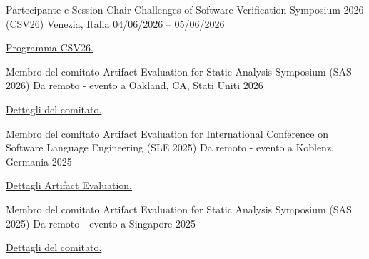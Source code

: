
\begin{cventries}

    \cventry
        {Partecipante e Session Chair} %
        {Challenges of Software Verification Symposium 2026 (CSV26)} %
        {Venezia, Italia} %
        {04/06/2026 – 05/06/2026} %
        {
        \begin{cvitems} %
            \item {\href{https://unive-ssv.github.io/csv.html}{Programma CSV26.}}
        \end{cvitems}
        }

    \cventry
        {Membro del comitato} %
        {Artifact Evaluation for Static Analysis Symposium (SAS 2026)} %
        {Da remoto - evento a Oakland, CA, Stati Uniti} %
        {2026} %
        {
        \begin{cvitems} %
            \item {\href{https://conf.researchr.org/committee/splash-issta-2026/sas-2026-sas-artifact-sas-artifact-evaluation-committee}{Dettagli del comitato.}}
        \end{cvitems}
        }

    \cventry
        {Membro del comitato} %
        {Artifact Evaluation for International Conference on Software Language Engineering (SLE 2025)} %
        {Da remoto - evento a Koblenz, Germania} %
        {2025} %
        {
        \begin{cvitems} %
            \item {\href{https://www.sleconf.org/2025/ArtifactEvaluation.html}{Dettagli Artifact Evaluation.}}
        \end{cvitems}
        }

    \cventry
        {Membro del comitato} %
        {Artifact Evaluation for Static Analysis Symposium (SAS 2025)} %
        {Da remoto - evento a Singapore} %
        {2025} %
        {
        \begin{cvitems} %
            \item {\href{https://2025.splashcon.org/committee/sas-2025-sas-artifact-sas-artifact-evaluation-committee}{Dettagli del comitato.}}
        \end{cvitems}
        }


\end{cventries}
